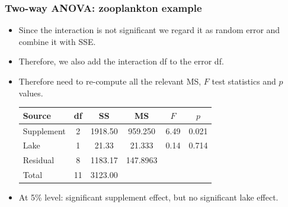 \documentclass[12pt,xcolor=dvipsnames,handout,mathserif,aspectratio=169]{beamer}
\begin{document}
\begin{frame}
\frametitle{Two-way ANOVA: zooplankton example}
\begin{itemize}
\item Since the interaction is  not significant we regard it as random error and combine it with SSE.
\vspace*{0.3cm}
\item Therefore, we also add the interaction df to the error df.
\vspace*{0.3cm}
\item Therefore need to re-compute all the relevant MS,  $F$ test statistics and $p$ values.
\begin{center}
\begin{tabular}{lccccc} \hline
Source& df& SS& MS& $F$& $p$\\ \hline
Supplement    &2  &1918.50  &959.250  &6.49  &0.021\\
Lake          &1    &21.33   &21.333  &0.14 & 0.714\\
Residual         &8   &1183.17  &147.8963 & & \\\hline
Total        &11  &3123.00 & & &\\\hline
\end{tabular}
\end{center}
\vspace*{0.3cm}
\item At 5\% level: significant supplement effect, but no significant lake effect.
\end{itemize}
\end{frame}


\end{document}
